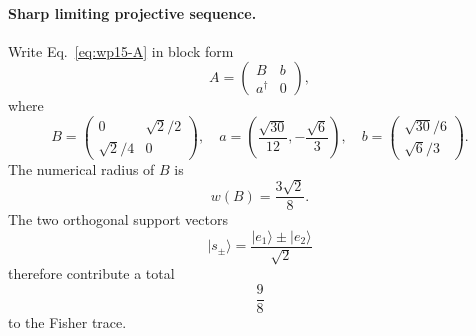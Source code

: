 \paragraph{Sharp limiting projective sequence.}
Write Eq.~\eqref{eq:wp15-A} in block form
\begin{equation}
A=\begin{pmatrix}B&b\\a^\dagger&0\end{pmatrix},
\end{equation}
where
\begin{equation}
B=
\begin{pmatrix}
0&\sqrt2/2\\
\sqrt2/4&0
\end{pmatrix},
\quad
 a=\left(\frac{\sqrt{30}}{12},-\frac{\sqrt6}{3}\right),
\quad
 b=\begin{pmatrix}\sqrt{30}/6\\\sqrt6/3\end{pmatrix}.
\end{equation}
The numerical radius of $B$ is
\begin{equation}
w(B)=\frac{3\sqrt2}{8}.
\end{equation}
The two orthogonal support vectors
\begin{equation}
|s_\pm\rangle=\frac{|e_1\rangle\pm|e_2\rangle}{\sqrt2}
\end{equation}
therefore contribute a total
\begin{equation}
\frac98
\end{equation}
to the Fisher trace.

